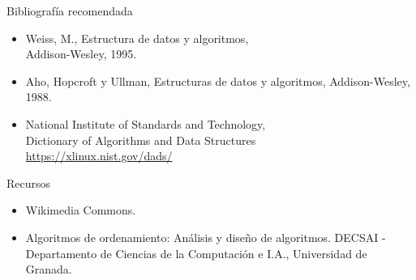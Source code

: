 \documentclass{beamer} %
\begin{document}
\begin{frame}
 \begin{block}{Bibliografía recomendada}
  \begin{itemize}
    \item Weiss, M., Estructura de datos y algoritmos,\\ Addison-Wesley, 1995.
    \item Aho, Hopcroft y Ullman, Estructuras de datos y algoritmos, Addison-Wesley, 1988.
    \item National Institute of Standards and Technology,\\
    Dictionary of Algorithms and Data Structures\\ \url{https://xlinux.nist.gov/dads/}
  \end{itemize}
 \end{block}
 \begin{block}{Recursos}
  \begin{itemize}
    \item Wikimedia Commons.
    \item Algoritmos de ordenamiento: Análisis y diseño de algoritmos. DECSAI - Departamento de Ciencias de la Computación e I.A., Universidad de Granada.
  \end{itemize}
 \end{block}
\end{frame}
\end{document}
